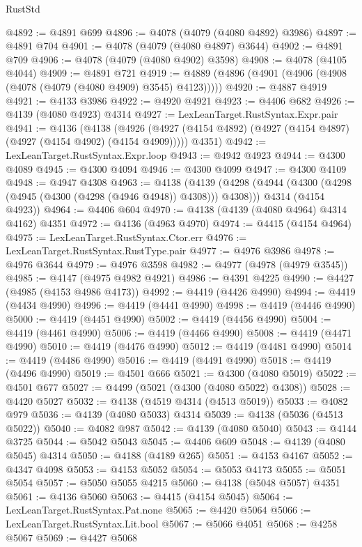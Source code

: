 \begin{lexlean}{RustStd}
\begin{coremodule}
@4892 := @4891 @699
@4896 := @4078 (@4079 (@4080 @4892) @3986)
@4897 := @4891 @704
@4901 := @4078 (@4079 (@4080 @4897) @3644)
@4902 := @4891 @709
@4906 := @4078 (@4079 (@4080 @4902) @3598)
@4908 := @4078 (@4105 @4044)
@4909 := @4891 @721
@4919 := @4889 (@4896 (@4901 (@4906 (@4908 (@4078 (@4079 (@4080 @4909) @3545) @4123)))))
@4920 := @4887 @4919
@4921 := @4133 @3986
@4922 := @4920 @4921
@4923 := @4406 @682
@4926 := @4139 (@4080 @4923) @4314
@4927 := LexLeanTarget.RustSyntax.Expr.pair
@4941 := @4136
    (@4138
      (@4926 (@4927 (@4154 @4892) (@4927 (@4154 @4897) (@4927 (@4154 @4902) (@4154 @4909)))))
      @4351)
@4942 := LexLeanTarget.RustSyntax.Expr.loop
@4943 := @4942 @4923
@4944 := @4300 @4089
@4945 := @4300 @4094
@4946 := @4300 @4099
@4947 := @4300 @4109
@4948 := @4947 @4308
@4963 := @4138
    (@4139
      (@4298 (@4944 (@4300 (@4298 (@4945 (@4300 (@4298 (@4946 @4948)) @4308))) @4308)))
      @4314
      (@4154 @4923))
@4964 := @4406 @604
@4970 := @4138 (@4139 (@4080 @4964) @4314 @4162) @4351
@4972 := @4136 (@4963 @4970)
@4974 := @4415 (@4154 @4964)
@4975 := LexLeanTarget.RustSyntax.Ctor.err
@4976 := LexLeanTarget.RustSyntax.RustType.pair
@4977 := @4976 @3986
@4978 := @4976 @3644
@4979 := @4976 @3598
@4982 := @4977 (@4978 (@4979 @3545))
@4985 := @4147 (@4975 @4982 @4921)
@4986 := @4391 @4225
@4990 := @4427 (@4985 (@4153 @4986 @4173))
@4992 := @4419 (@4426 @4990)
@4994 := @4419 (@4434 @4990)
@4996 := @4419 (@4441 @4990)
@4998 := @4419 (@4446 @4990)
@5000 := @4419 (@4451 @4990)
@5002 := @4419 (@4456 @4990)
@5004 := @4419 (@4461 @4990)
@5006 := @4419 (@4466 @4990)
@5008 := @4419 (@4471 @4990)
@5010 := @4419 (@4476 @4990)
@5012 := @4419 (@4481 @4990)
@5014 := @4419 (@4486 @4990)
@5016 := @4419 (@4491 @4990)
@5018 := @4419 (@4496 @4990)
@5019 := @4501 @666
@5021 := @4300 (@4080 @5019)
@5022 := @4501 @677
@5027 := @4499 (@5021 (@4300 (@4080 @5022) @4308))
@5028 := @4420 @5027
@5032 := @4138 (@4519 @4314 (@4513 @5019))
@5033 := @4082 @979
@5036 := @4139 (@4080 @5033) @4314
@5039 := @4138 (@5036 (@4513 @5022))
@5040 := @4082 @987
@5042 := @4139 (@4080 @5040)
@5043 := @4144 @3725
@5044 := @5042 @5043
@5045 := @4406 @609
@5048 := @4139 (@4080 @5045) @4314
@5050 := @4188 (@4189 @265)
@5051 := @4153 @4167
@5052 := @4347 @4098
@5053 := @4153 @5052
@5054 := @5053 @4173
@5055 := @5051 @5054
@5057 := @5050 @5055 @4215
@5060 := @4138 (@5048 @5057) @4351
@5061 := @4136 @5060
@5063 := @4415 (@4154 @5045)
@5064 := LexLeanTarget.RustSyntax.Pat.none
@5065 := @4420 @5064
@5066 := LexLeanTarget.RustSyntax.Lit.bool
@5067 := @5066 @4051
@5068 := @4258 @5067
@5069 := @4427 @5068

\end{coremodule}
\end{lexlean}
